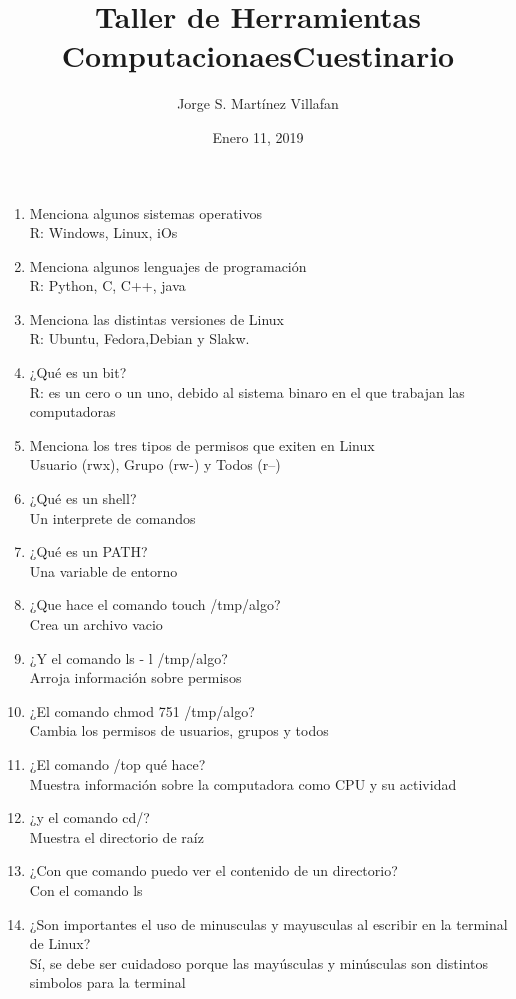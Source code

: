 \documentclass[letterpaper, 12pt, oneside]{article}%
\title{\Huge Taller de Herramientas Computacionaes}
\author{Jorge S. Martínez Villafan}
\date{Enero 11, 2019}
\begin{document}
\maketitle
\newpage
\title{Cuestinario}

\begin{enumerate}
	\item Menciona algunos sistemas operativos\\
R: Windows, Linux, iOs
\item Menciona algunos lenguajes de programación\\
R: Python, C, C++, java
\item Menciona las distintas versiones de Linux\\
R: Ubuntu, Fedora,Debian y Slakw.
\item ¿Qué es un bit?\\
R: es un cero o un uno, debido al sistema binaro en el que trabajan las computadoras
\item Menciona los tres tipos de permisos que exiten en Linux\\
	Usuario (rwx), Grupo (rw-) y Todos (r--)
\item ¿Qué es un shell?\\
Un interprete de comandos
\item ¿Qué es un PATH?\\
Una variable de entorno
\item ¿Que hace el comando touch /tmp/algo?\\ 
Crea un archivo vacio
\item ¿Y el comando ls - l /tmp/algo?\\ 
Arroja información sobre permisos
\item ¿El comando chmod 751 /tmp/algo?\\
Cambia los permisos de usuarios, grupos y todos
\item ¿El comando /top qué hace?\\ 
Muestra información sobre la computadora como CPU y su actividad
\item ¿y el comando cd/?\\ 
Muestra el directorio de raíz
\item ¿Con que comando puedo ver el contenido de un directorio?\\
Con el comando ls
\item ¿Son importantes el uso de minusculas y mayusculas al escribir en la terminal de Linux?\\
Sí, se debe ser cuidadoso porque las mayúsculas y minúsculas son distintos simbolos para la terminal

\end{enumerate}
\end{document}
